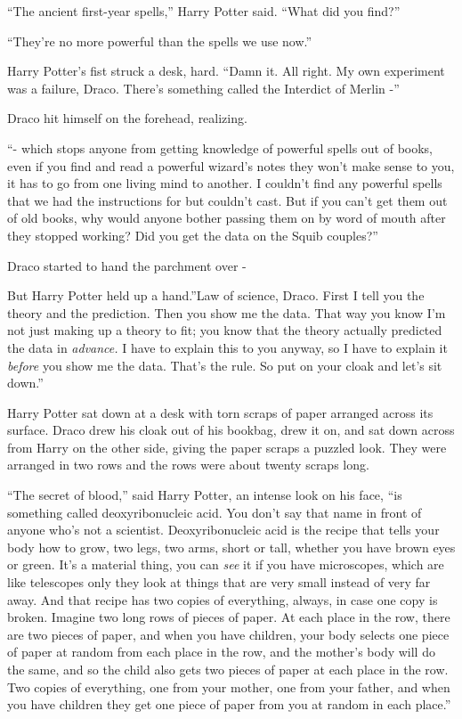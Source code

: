 ``The ancient first-year spells,'' Harry Potter said. ``What did you
find?''

``They're no more powerful than the spells we use now.''

Harry Potter's fist struck a desk, hard. ``Damn it. All right. My own
experiment was a failure, Draco. There's something called the Interdict
of Merlin -''

Draco hit himself on the forehead, realizing.

``- which stops anyone from getting knowledge of powerful spells out of
books, even if you find and read a powerful wizard's notes they won't
make sense to you, it has to go from one living mind to another. I
couldn't find any powerful spells that we had the instructions for but
couldn't cast. But if you can't get them out of old books, why would
anyone bother passing them on by word of mouth after they stopped
working? Did you get the data on the Squib couples?''

Draco started to hand the parchment over -

But Harry Potter held up a hand.''Law of science, Draco. First I tell
you the theory and the prediction. Then you show me the data. That way
you know I'm not just making up a theory to fit; you know that the
theory actually predicted the data in \emph{advance.} I have to explain
this to you anyway, so I have to explain it \emph{before} you show me
the data. That's the rule. So put on your cloak and let's sit down.''

Harry Potter sat down at a desk with torn scraps of paper arranged
across its surface. Draco drew his cloak out of his bookbag, drew it on,
and sat down across from Harry on the other side, giving the paper
scraps a puzzled look. They were arranged in two rows and the rows were
about twenty scraps long.

``The secret of blood,'' said Harry Potter, an intense look on his face,
``is something called deoxyribonucleic acid. You don't say that name in
front of anyone who's not a scientist. Deoxyribonucleic acid is the
recipe that tells your body how to grow, two legs, two arms, short or
tall, whether you have brown eyes or green. It's a material thing, you
can \emph{see} it if you have microscopes, which are like telescopes
only they look at things that are very small instead of very far away.
And that recipe has two copies of everything, always, in case one copy
is broken. Imagine two long rows of pieces of paper. At each place in
the row, there are two pieces of paper, and when you have children, your
body selects one piece of paper at random from each place in the row,
and the mother's body will do the same, and so the child also gets two
pieces of paper at each place in the row. Two copies of everything, one
from your mother, one from your father, and when you have children they
get one piece of paper from you at random in each place.''


